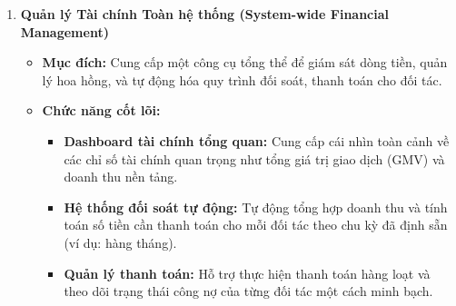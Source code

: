 \begin{enumerate}
    \item \textbf{Quản lý Tài chính Toàn hệ thống (System-wide Financial Management)}
    \begin{itemize}
        \item \textbf{Mục đích:} Cung cấp một công cụ tổng thể để giám sát dòng tiền, quản lý hoa hồng, và tự động hóa quy trình đối soát, thanh toán cho đối tác.
        \item \textbf{Chức năng cốt lõi:}
        \begin{itemize}
            \item \textbf{Dashboard tài chính tổng quan:} Cung cấp cái nhìn toàn cảnh về các chỉ số tài chính quan trọng như tổng giá trị giao dịch (GMV) và doanh thu nền tảng.
            \item \textbf{Hệ thống đối soát tự động:} Tự động tổng hợp doanh thu và tính toán số tiền cần thanh toán cho mỗi đối tác theo chu kỳ đã định sẵn (ví dụ: hàng tháng).
            \item \textbf{Quản lý thanh toán:} Hỗ trợ thực hiện thanh toán hàng loạt và theo dõi trạng thái công nợ của từng đối tác một cách minh bạch.
        \end{itemize}
    \end{itemize} 

\end{enumerate}

